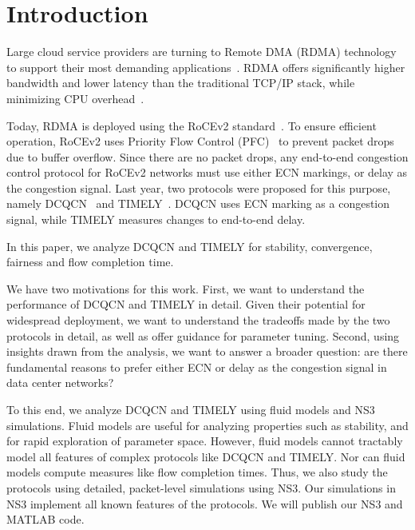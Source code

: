 \section{Introduction}

Large cloud service providers are turning to Remote DMA (RDMA) technology to
support their most demanding applications~\cite{dcqcn,timely,tcp-bolt}.  RDMA
offers significantly higher bandwidth and lower latency than the traditional
TCP/IP stack, while minimizing CPU overhead~\cite{dcqcn,farm,timely}. 

Today, RDMA is deployed using the RoCEv2 standard~\cite{rocev2}. To ensure
efficient operation, RoCEv2 uses Priority Flow Control (PFC)~\cite{pfc} to
prevent packet drops due to buffer overflow.  Since there are no packet drops,
any end-to-end congestion control protocol for RoCEv2 networks must use either
ECN markings, or delay as the congestion signal.  Last year, two protocols were
proposed for this purpose, namely DCQCN~\cite{dcqcn} and TIMELY~\cite{timely}.
DCQCN uses ECN marking as a congestion signal, while TIMELY measures changes to
end-to-end delay.


In this paper, we analyze DCQCN and TIMELY for stability, convergence,
fairness and flow completion time.

We have two motivations for this work. First, we want to understand the
performance of DCQCN and TIMELY in detail. Given their potential for widespread
deployment, we want to understand the tradeoffs made by the two protocols in
detail, as well as offer guidance for parameter tuning.  Second, using insights
drawn from the analysis, we want to answer a broader question: are there
fundamental reasons to prefer either ECN or delay as the congestion signal in
data center networks? 


To this end, we analyze DCQCN and TIMELY using fluid models and NS3~\cite{NS3}
simulations. Fluid models are useful for analyzing properties such as stability,
and for rapid exploration of parameter space. However, fluid models cannot
tractably model all features of complex protocols like DCQCN and TIMELY. Nor can
fluid models compute measures like flow completion times. Thus, we also study
the protocols using detailed, packet-level simulations using NS3. Our
simulations in NS3 implement all known features of the protocols. We will publish
our NS3 and MATLAB code.



